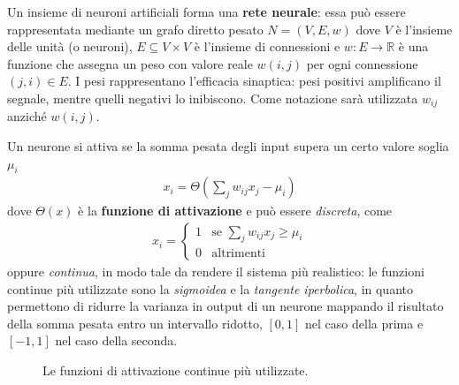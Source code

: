 \noindent Un insieme di neuroni artificiali forma una \textbf{rete neurale}: essa può essere rappresentata mediante un grafo diretto pesato $N=(V, E, w)$ dove $V$ è l'insieme delle unità (o neuroni), $E \subseteq V \times V$ è l'insieme di connessioni e $w:E \rightarrow \mathbb{R}$ è una funzione che assegna un peso con valore reale $w(i,j)$ per ogni connessione $(j, i)\in E$. I pesi rappresentano l'efficacia sinaptica: pesi positivi amplificano il segnale, mentre quelli negativi lo inibiscono. Come notazione sarà utilizzata $w_{ij}$ anziché $w(i,j)$.

Un neurone si attiva se la somma pesata degli input supera un certo valore soglia $\mu_i$\begin{align}
	x_i = \Theta\left(\sum_j w_{ij} x_j - \mu_i \right)
\end{align}
dove $\Theta(x)$ è la \textbf{funzione di attivazione} e può essere \emph{discreta}, come
\begin{align}
	x_i = \begin{cases}
		1 & \mbox{se } \displaystyle\sum_j w_{ij} x_j \geq \mu_i \\
		0 & \mbox{altrimenti} 
	\end{cases}
\end{align}
oppure \emph{continua}, in modo tale da rendere il sistema più realistico: le funzioni continue più utilizzate sono la \emph{sigmoidea} e la \emph{tangente iperbolica}, in quanto permettono di ridurre la varianza in output di un neurone mappando il risultato della somma pesata entro un intervallo ridotto, $[0, 1]$ nel caso della prima e $[-1, 1]$ nel caso della seconda.
\begin{figure}[h!]
	\begin{center}
		\qquad
		\caption{Le funzioni di attivazione continue più utilizzate.}
	\end{center}
\end{figure}

